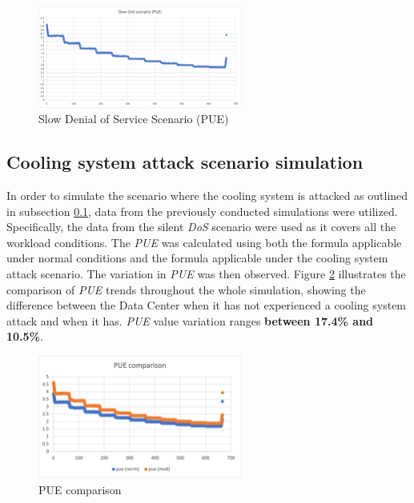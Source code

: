 \begin{figure}[h]
    \centering
    \includegraphics[width=0.6\textwidth]{chapters/images/slow_dos_pue.png}
    \caption{Slow Denial of Service Scenario (PUE)}
    \label{fig:slow_dos_pue}
\end{figure}

\subsection{Cooling system attack scenario simulation} \label{subsection:coolingsystemattack}
In order to simulate the scenario where the cooling system is attacked as outlined in subsection \ref{subsection:coolingsystemattack}, data from the previously conducted simulations were utilized. Specifically, the data from the silent \emph{DoS} scenario were used as it covers all the workload conditions. The \emph{PUE} was calculated using both the formula applicable under normal conditions and the formula applicable under the cooling system attack scenario. The variation in \emph{PUE} was then observed. Figure \ref{fig:pue_comp} illustrates the comparison of \emph{PUE} trends throughout the whole simulation, showing the difference between the Data Center when it has not experienced a cooling system attack and when it has. \emph{PUE} value variation ranges \textbf{between 17.4\% and 10.5\%}.
\begin{figure}[h]
    \centering
    \includegraphics[width=0.6\textwidth]{chapters/images/pue_comp.png}
    \caption{PUE comparison}
    \label{fig:pue_comp}
\end{figure}



